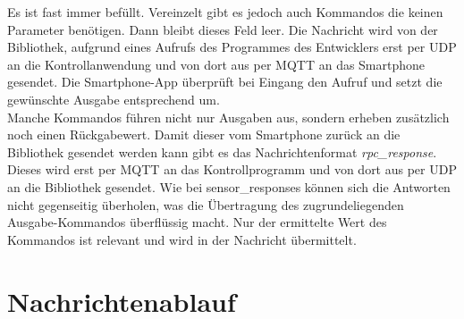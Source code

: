\documentclass[11pt,a4paper]{report}
\begin{document}
Es ist fast immer befüllt.
Vereinzelt gibt es jedoch auch Kommandos die keinen Parameter benötigen.
Dann bleibt dieses Feld leer.
Die Nachricht wird von der Bibliothek, aufgrund eines Aufrufs des Programmes des Entwicklers erst per UDP an die Kontrollanwendung und von dort aus per MQTT an das Smartphone gesendet.
Die Smartphone-App überprüft bei Eingang den Aufruf und setzt die gewünschte Ausgabe entsprechend um.
\\
Manche Kommandos führen nicht nur Ausgaben aus, sondern erheben zusätzlich noch einen Rückgabewert.
Damit dieser vom Smartphone zurück an die Bibliothek gesendet werden kann gibt es das Nachrichtenformat \textit{rpc\_response}.
Dieses wird erst per MQTT an das Kontrollprogramm und von dort aus per UDP an die Bibliothek gesendet.
Wie bei sensor\_responses können sich die Antworten nicht gegenseitig überholen, was die Übertragung des zugrundeliegenden Ausgabe-Kommandos überflüssig macht.
Nur der ermittelte Wert des Kommandos ist relevant und wird in der Nachricht übermittelt.
\section{Nachrichtenablauf}
\end{document}
